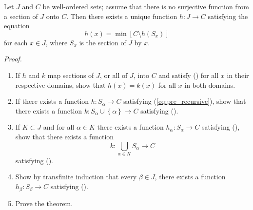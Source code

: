 \documentclass[a4paper,12pt]{article}
\begin{document}
\begin{exe}\leavevmode \par
	\noindent {}\;\;
	Let \( J \) and \( C \) be well-ordered sets;
	assume that there is no surjective function from a section of \( J \) onto \( C \).
	Then there exists a unique function
	\( h: J \to C \)
	satisfying the equation
	\begin{equation}\label{eq:pre_recursive}
		h(x)=\min{\left[ C \setminus h(S_x) \right]}
	\end{equation}
	for each \( x \in J \),
	where \( S_x \) is the section of \( J \) by \( x \).
	
	\textit{Proof.}
	\begin{enumerate}
		\item
		      If \( h \) and \( k \) map sections of \( J \), or all of \( J \), into \( C \)
		      and satisfy () for all \( x \) in their respective domains,
		      show that \( h(x)=k(x) \) for all \( x \) in both domains.
		      
		\item
		      If there exists a function \( h:S_{\alpha}\to C\) satisfying (\ref{eq:pre_recursive}),
		      show that there exists a function
		      \( k :S_{\alpha}\cup \left\{ \alpha \right\}\to C \)
		      satisfying ().
		      
		\item
		      If \( K \subset J \)
		      and for all \( \alpha \in K \) there exists a function
		      \( h_{\alpha}: S_{\alpha}\to C \)
		      satisfying (),
		      show that there exists a function
		      \begin{equation*}
			      k: \bigcup_{\alpha \in K} S_{\alpha}\to C
		      \end{equation*}
		      satisfying ().
		      
		\item
		      Show by transfinite induction that every \( \beta \in J \),
		      there exists a function
		      \( h_{\beta}: S_{\beta}\to C\)
		      satisfying ().
		      
		\item
		      Prove the theorem.
	\end{enumerate}
\end{exe}
\end{document}
